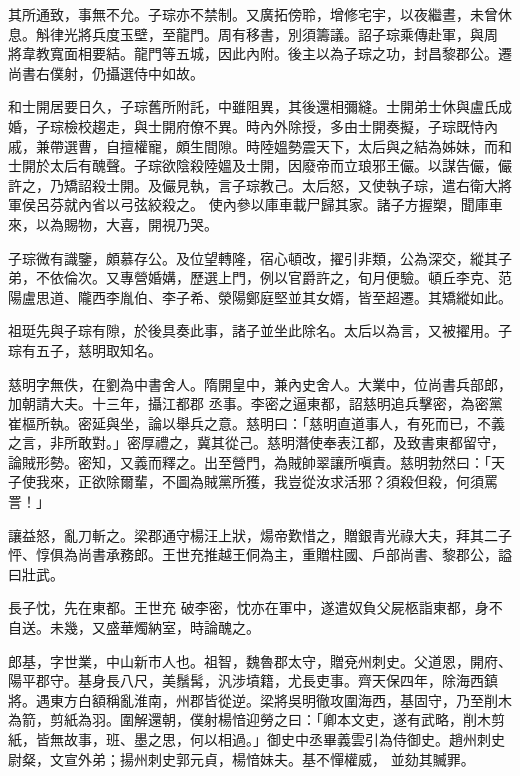 \begin{pinyinscope}
 其所通致，事無不允。子琮亦不禁制。又廣拓傍聆，增修宅宇，以夜繼晝，未曾休息。斛律光將兵度玉壁，至龍門。周有移書，別須籌議。詔子琮乘傳赴軍，與周
 將韋教寬面相要結。龍門等五城，因此內附。後主以為子琮之功，封昌黎郡公。遷尚書右僕射，仍攝選侍中如故。



 和士開居要日久，子琮舊所附託，中雖阻異，其後還相彌縫。士開弟士休與盧氏成婚，子琮檢校趨走，與士開府僚不異。時內外除授，多由士開奏擬，子琮既恃內戚，兼帶選曹，自擅權寵，頗生間隙。時陸媼勢震天下，太后與之結為姊妹，而和士開於太后有醜聲。子琮欲陰殺陸媼及士開，因廢帝而立琅邪王儼。以謀告儼，儼許之，乃矯詔殺士開。及儼見執，言子琮教己。太后怒，又使執子琮，遣右衛大將軍侯呂芬就內省以弓弦絞殺之。
 使內參以庫車載尸歸其家。諸子方握槊，聞庫車來，以為賜物，大喜，開視乃哭。



 子琮微有識鑒，頗慕存公。及位望轉隆，宿心頓改，擢引非類，公為深交，縱其子弟，不依倫次。又專營婚媾，歷選上門，例以官爵許之，旬月便驗。頓丘李克、范陽盧思道、隴西李胤伯、李子希、滎陽鄭庭堅並其女婿，皆至超遷。其矯縱如此。



 祖珽先與子琮有隙，於後具奏此事，諸子並坐此除名。太后以為言，又被擢用。子琮有五子，慈明取知名。



 慈明字無佚，在劉為中書舍人。隋開皇中，兼內史舍人。大業中，位尚書兵部郎，加朝請大夫。十三年，攝江都郡
 丞事。李密之逼東都，詔慈明追兵擊密，為密黨崔樞所執。密延與坐，論以舉兵之意。慈明曰：「慈明直道事人，有死而已，不義之言，非所敢對。」密厚禮之，冀其從己。慈明潛使奉表江都，及致書東都留守，論賊形勢。密知，又義而釋之。出至營門，為賊帥翠讓所嗔責。慈明勃然曰：「天子使我來，正欲除爾輩，不圖為賊黨所獲，我豈從汝求活邪？須殺但殺，何須罵詈！」



 讓益怒，亂刀斬之。梁郡通守楊汪上狀，煬帝歎惜之，贈銀青光祿大夫，拜其二子怦、惇俱為尚書承務郎。王世充推越王侗為主，重贈柱國、戶部尚書、黎郡公，謚曰壯武。



 長子忱，先在東都。王世充
 破李密，忱亦在軍中，遂遣奴負父屍柩詣東都，身不自送。未幾，又盛華燭納室，時論醜之。



 郎基，字世業，中山新市人也。祖智，魏魯郡太守，贈兗州刺史。父道恩，開府、陽平郡守。基身長八尺，美鬚髯，汎涉墳籍，尤長吏事。齊天保四年，除海西鎮將。遇東方白額稱亂淮南，州郡皆從逆。梁將吳明徹攻圍海西，基固守，乃至削木為箭，剪紙為羽。圍解還朝，僕射楊愔迎勞之曰：「卿本文吏，遂有武略，削木剪紙，皆無故事，班、墨之思，何以相過。」御史中丞畢義雲引為侍御史。趙州刺史尉粲，文宣外弟；揚州刺史郭元貞，楊愔妹夫。基不憚權威，
 並劾其贓罪。




\end{pinyinscope}
